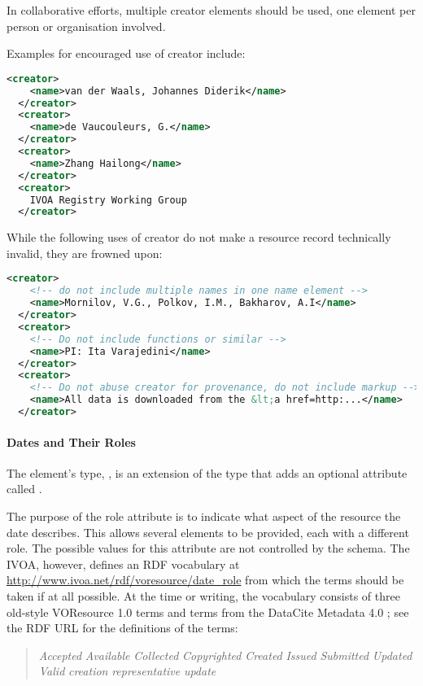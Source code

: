 \documentclass[11pt,a4paper]{ivoa}
\begin{document}
In collaborative efforts, multiple creator elements should be used, one
element per person or organisation involved.

Examples for encouraged use of creator include:

\begin{lstlisting}[language=XML,basicstyle=\footnotesize]
  <creator>
    <name>van der Waals, Johannes Diderik</name>
  </creator>
  <creator>
    <name>de Vaucouleurs, G.</name>
  </creator>
  <creator>
    <name>Zhang Hailong</name>
  </creator>
  <creator>
    IVOA Registry Working Group
  </creator>
\end{lstlisting}

While the following uses of creator do not make a resource record
technically invalid, they are frowned upon:

\begin{lstlisting}[language=XML,basicstyle=\footnotesize]
  <creator>
    <!-- do not include multiple names in one name element -->
    <name>Mornilov, V.G., Polkov, I.M., Bakharov, A.I</name>
  </creator>
  <creator>
    <!-- Do not include functions or similar -->
    <name>PI: Ita Varajedini</name>
  </creator>
  <creator>
    <!-- Do not abuse creator for provenance, do not include markup -->
    <name>All data is downloaded from the &lt;a href=http:...</name>
  </creator>
\end{lstlisting}

\paragraph{Dates and Their Roles}

The  element's type, , is an extension of the
 type that adds an
optional attribute called .  

The purpose of the role attribute is to indicate what aspect of the
resource the date describes. This allows several  elements to be
provided, each with a different role. The possible values for this
attribute are not controlled by the schema.  The IVOA, however, defines
an RDF vocabulary at
\url{http://www.ivoa.net/rdf/voresource/date_role} from
which the  terms should be taken if at all possible.  At the
time or writing, the vocabulary consists of three old-style VOResource
1.0 terms and terms from the DataCite Metadata 4.0 \citep{std:DataCite40}; 
see the RDF URL for
the definitions of the terms:

\begin{quotation}\noindent
\textsl{Accepted}
\textsl{Available}
\textsl{Collected}
\textsl{Copyrighted}
\textsl{Created}
\textsl{Issued}
\textsl{Submitted}
\textsl{Updated}
\textsl{Valid}
\textsl{creation}
\textsl{representative}
\textsl{update}

\end{quotation}
\end{document}
